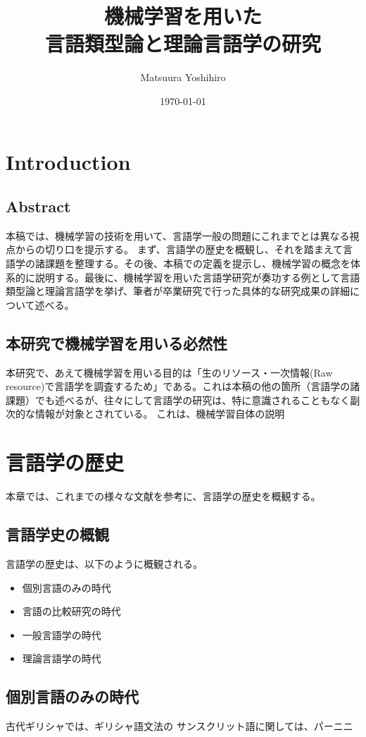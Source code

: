 \documentclass[12pt, oneside]{book} %
\title{機械学習を用いた\\言語類型論と理論言語学の研究}
\author{Matsuura Yoshihiro} %
\date{\today} %
\begin{document}
\maketitle

\tableofcontents

\mainmatter
\part{Introduction}
\chapter{Abstract}
本稿では、機械学習の技術を用いて、言語学一般の問題にこれまでとは異なる視点からの切り口を提示する。
まず、言語学の歴史を概観し、それを踏まえて言語学の諸課題を整理する。その後、本稿での定義を提示し、機械学習の概念を体系的に説明する。最後に、機械学習を用いた言語学研究が奏功する例として言語類型論と理論言語学を挙げ、筆者が卒業研究で行った具体的な研究成果の詳細について述べる。
\chapter{本研究で機械学習を用いる必然性}
本研究で、あえて機械学習を用いる目的は「生のリソース・一次情報(Raw resource)で言語学を調査するため」である。これは本稿の他の箇所（言語学の諸課題）でも述べるが、往々にして言語学の研究は、特に意識されることもなく副次的な情報が対象とされている。
これは、機械学習自体の説明
\part{言語学の歴史}
本章では、これまでの様々な文献を参考に、言語学の歴史を概観する。
\chapter{言語学史の概観}
言語学の歴史は、以下のように概観される。
\begin{itemize}
    \item 個別言語のみの時代
    \item 言語の比較研究の時代
    \item 一般言語学の時代
    \item 理論言語学の時代
\end{itemize}
\chapter{個別言語のみの時代}
古代ギリシャでは、ギリシャ語文法の
サンスクリット語に関しては、パーニニ
\end{document}
